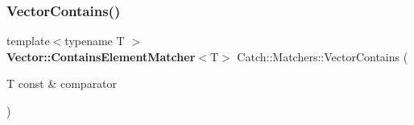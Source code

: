 \mbox{\label{namespace_catch_1_1_matchers_ae8db5846328116fb36386893deaec944}} 
\subsubsection{Vector\+Contains()}
{\footnotesize\ttfamily template$<$typename T $>$ \\
\textbf{ Vector\+::\+Contains\+Element\+Matcher}$<$T$>$ Catch\+::\+Matchers\+::\+Vector\+Contains (\begin{DoxyParamCaption}\item[{T const \&}]{comparator }\end{DoxyParamCaption})}

